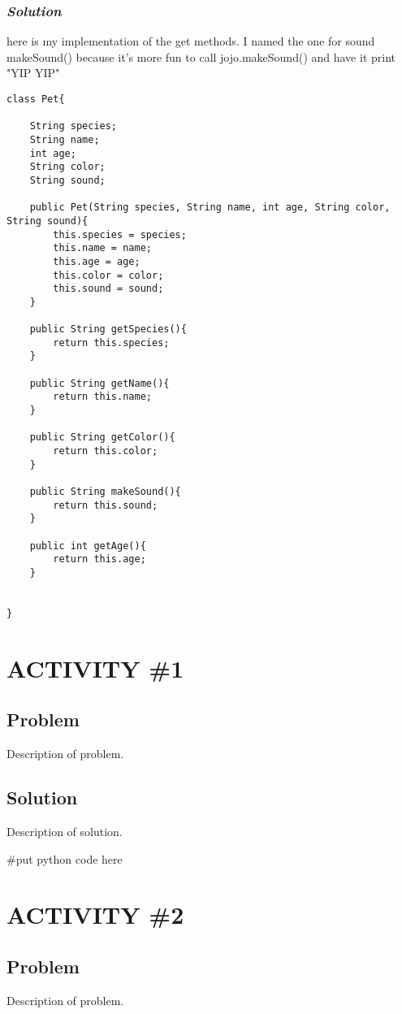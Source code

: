 \documentclass[14pt]{extreport}%
\begin{document}
\subsubsection{\textit{Solution}}
here is my implementation of the get methods. I named the one for sound makeSound() because it's more fun to call jojo.makeSound() and have it print "YIP YIP"
\begin{lstlisting}
class Pet{

    String species;
    String name;
    int age;
    String color;
    String sound;

    public Pet(String species, String name, int age, String color, String sound){
        this.species = species;
        this.name = name;
        this.age = age;
        this.color = color;
        this.sound = sound;
    }

    public String getSpecies(){
        return this.species;
    }

    public String getName(){
        return this.name;
    }

    public String getColor(){
        return this.color;
    }

    public String makeSound(){
        return this.sound;
    }

    public int getAge(){
        return this.age;
    }


}
\end{lstlisting}{}



\section*{ACTIVITY \#1} 
\subsection*{Problem}
Description of problem.
\subsection*{Solution}
Description of solution.\\
\begin{python}
#put python code here
\end{python}

\section*{ACTIVITY \#2} 
\subsection*{Problem}
Description of problem.
\end{document}
